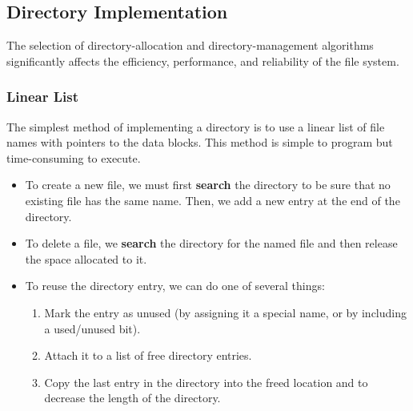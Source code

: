 \subsection{Directory Implementation}\label{subsec:Directory_Implementation}
The selection of directory-allocation and directory-management algorithms significantly affects the efficiency, performance, and reliability of the file system.

\subsubsection{Linear List}\label{subsubsec:Linear_List_Directory}
The simplest method of implementing a directory is to use a linear list of file names with pointers to the data blocks.
This method is simple to program but time-consuming to execute.
\begin{itemize}[noitemsep]
\item To create a new file, we must first \textbf{search} the directory to be sure that no existing file has the same name.
  Then, we add a new entry at the end of the directory.
\item To delete a file, we \textbf{search} the directory for the named file and then release the space allocated to it.
\item To reuse the directory entry, we can do one of several things:
  \begin{enumerate}[noitemsep]
  \item Mark the entry as unused (by assigning it a special name, or by including a used/unused bit).
  \item Attach it to a list of free directory entries.
  \item Copy the last entry in the directory into the freed location and to decrease the length of the directory.
  \end{enumerate}
\end{itemize}


